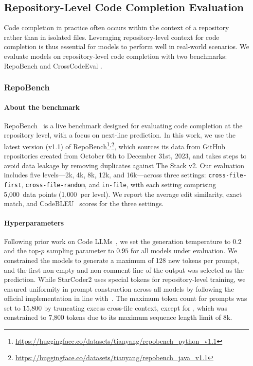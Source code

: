 \documentclass[10pt]{article} %
\begin{document}
\subsection{Repository-Level Code Completion Evaluation}

Code completion in practice often occurs within the context of a repository rather than in isolated files. Leveraging repository-level context for code completion is thus essential for models to perform well in real-world scenarios. We evaluate models on repository-level code completion with two benchmarks: RepoBench \citep{liu2023repobench} and CrossCodeEval \citep{ding2023crosscodeeval}.

\subsubsection{RepoBench}

\paragraph{About the benchmark} RepoBench~\citep{liu2023repobench} is a live benchmark designed for evaluating code completion at the repository level, with a focus on next-line prediction. In this work, we use the latest version (v1.1) of RepoBench\footnote{\url{https://huggingface.co/datasets/tianyang/repobench_python_v1.1}}$^{,}$\footnote{\url{https://huggingface.co/datasets/tianyang/repobench_java_v1.1}}, which sources its data from GitHub repositories created from October 6th to December 31st, 2023, and takes steps to avoid data leakage by removing duplicates against The Stack v2. Our evaluation includes five levels---2k, 4k, 8k, 12k, and 16k---across three settings: \verb|cross-file-first|, \verb|cross-file-random|, and \verb|in-file|, with each setting comprising 5,000~data points (1,000~per level). We report the average edit similarity, exact match, and CodeBLEU~\citep{ren2020codebleu} scores for the three settings.

\paragraph{Hyperparameters} 
Following prior work on Code LLMs~\citep{chen2021evaluating}, we set the generation temperature to $0.2$ and the top-$p$ sampling parameter to $0.95$ for all models under evaluation. We constrained the models to generate a maximum of 128 new tokens per prompt, and the first non-empty and non-comment line of the output was selected as the prediction. While StarCoder2 uses special tokens for repository-level training, we ensured uniformity in prompt construction across all models by following the official implementation in line with~\citet{liu2023repobench}. The maximum token count for prompts was set to 15,800 by truncating excess cross-file context, except for \starcoderbase{}, which was constrained to 7,800 tokens due to its maximum sequence length limit of 8k.
\end{document}
